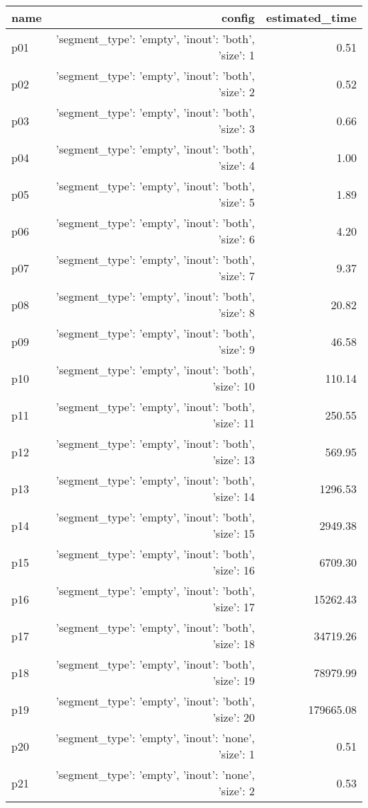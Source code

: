 \documentclass{article}
\begin{document}
                            \begin{center}
                            \scriptsize
                            \begin{tabular}{@{}l|r|r@{}}
                            name & config & estimated\_time\\\midrule
                              p01&{'segment\_type': 'empty', 'inout': 'both', 'size': 1}&0.51\\
  p02&{'segment\_type': 'empty', 'inout': 'both', 'size': 2}&0.52\\
  p03&{'segment\_type': 'empty', 'inout': 'both', 'size': 3}&0.66\\
  p04&{'segment\_type': 'empty', 'inout': 'both', 'size': 4}&1.00\\
  p05&{'segment\_type': 'empty', 'inout': 'both', 'size': 5}&1.89\\
  p06&{'segment\_type': 'empty', 'inout': 'both', 'size': 6}&4.20\\
  p07&{'segment\_type': 'empty', 'inout': 'both', 'size': 7}&9.37\\
  p08&{'segment\_type': 'empty', 'inout': 'both', 'size': 8}&20.82\\
  p09&{'segment\_type': 'empty', 'inout': 'both', 'size': 9}&46.58\\
  p10&{'segment\_type': 'empty', 'inout': 'both', 'size': 10}&110.14\\
  p11&{'segment\_type': 'empty', 'inout': 'both', 'size': 11}&250.55\\
  p12&{'segment\_type': 'empty', 'inout': 'both', 'size': 13}&569.95\\
  p13&{'segment\_type': 'empty', 'inout': 'both', 'size': 14}&1296.53\\
  p14&{'segment\_type': 'empty', 'inout': 'both', 'size': 15}&2949.38\\
  p15&{'segment\_type': 'empty', 'inout': 'both', 'size': 16}&6709.30\\
  p16&{'segment\_type': 'empty', 'inout': 'both', 'size': 17}&15262.43\\
  p17&{'segment\_type': 'empty', 'inout': 'both', 'size': 18}&34719.26\\
  p18&{'segment\_type': 'empty', 'inout': 'both', 'size': 19}&78979.99\\
  p19&{'segment\_type': 'empty', 'inout': 'both', 'size': 20}&179665.08\\
  p20&{'segment\_type': 'empty', 'inout': 'none', 'size': 1}&0.51\\
  p21&{'segment\_type': 'empty', 'inout': 'none', 'size': 2}&0.53\\

\end{tabular}
\end{center}
\end{document}

